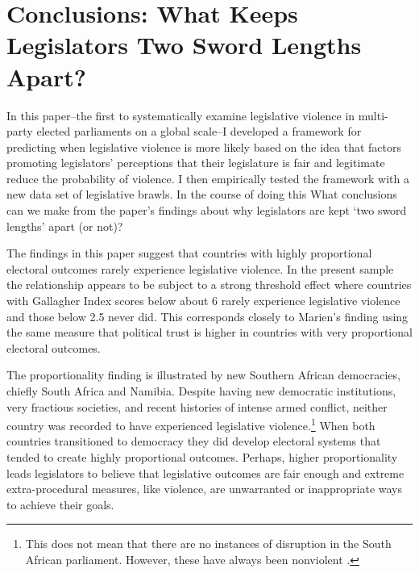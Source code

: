 \documentclass[a4paper]{article}\usepackage{graphicx, color}
\begin{document}
\section*{Conclusions: What Keeps Legislators Two Sword Lengths Apart?}

In this paper--the first to systematically examine legislative violence in multi-party elected parliaments on a global scale--I developed a framework for predicting when legislative violence is more likely based on the idea that factors promoting legislators' perceptions that their legislature is fair and legitimate reduce the probability of violence. I then empirically tested the framework with a new data set of legislative brawls. In the course of doing this What conclusions can we make from the paper's findings about why legislators are kept `two sword lengths' apart (or not)?

The findings in this paper suggest that countries with highly proportional electoral outcomes rarely experience legislative violence. In the present sample the relationship appears to be subject to a strong threshold effect where countries with Gallagher Index scores below about 6 rarely experience legislative violence and those below 2.5 never did. This corresponds closely to Marien's \cite{Marien2011} finding using the same measure that political trust is higher in countries with very proportional electoral outcomes. 

The proportionality finding is illustrated by new Southern African democracies, chiefly South Africa and Namibia. Despite having new democratic institutions, very fractious societies, and recent histories of intense armed conflict, neither country was recorded to have experienced legislative violence.\footnote{This does not mean that there are no instances of disruption in the South African parliament. However, these have always been nonviolent \cite{Johnson2013}.} When both countries transitioned to democracy they did develop electoral systems that tended to create highly proportional outcomes. Perhaps, higher proportionality leads legislators to believe that legislative outcomes are fair enough and extreme extra-procedural measures, like violence, are unwarranted or inappropriate ways to achieve their goals.    
\end{document}
